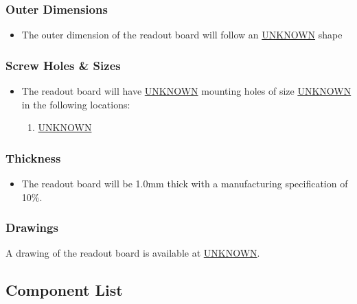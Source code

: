 \documentclass[11pt]{article}
\begin{document}
\subsubsection{Outer Dimensions}
\label{sec:org2ab2b44}
\begin{itemize}
\item The outer dimension of the readout board will follow an \uline{UNKNOWN} shape
\end{itemize}
\subsubsection{Screw Holes \& Sizes}
\label{sec:org70950f4}
\begin{itemize}
\item The readout board will have \uline{UNKNOWN} mounting holes of size \uline{UNKNOWN} in the following locations:
\begin{enumerate}
\item \uline{UNKNOWN}
\end{enumerate}
\end{itemize}
\subsubsection{Thickness}
\label{sec:orgdbc3805}
\begin{itemize}
\item The readout board will be 1.0mm thick with a manufacturing specification of \textpm{} 10\%.
\end{itemize}
\subsubsection{Drawings}
\label{sec:org8067f3b}
A drawing of the readout board is available at \uline{UNKNOWN}.
\subsection{Component List}
\label{sec:org296cee8}
\end{document}

